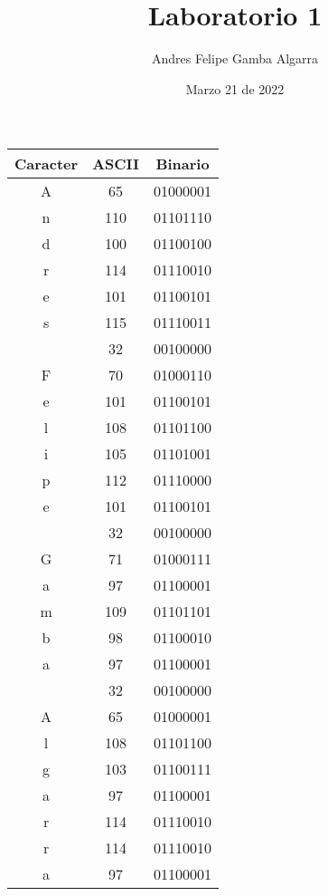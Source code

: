 \documentclass{article}
\title{Laboratorio 1}
\author{Andres Felipe Gamba Algarra}
\date{Marzo 21 de 2022}
\begin{document}
\maketitle

\section{}
\begin{center}
    \begin{tabular}{ |c|c|c| }
        \hline
        Caracter & ASCII & Binario\\
        \hline
        A & 65 & 01000001 \\
        n & 110 & 01101110 \\
        d & 100 & 01100100 \\
        r & 114 & 01110010 \\
        e & 101 & 01100101 \\
        s & 115 & 01110011 \\
          & 32 & 00100000 \\
        F & 70 & 01000110 \\
        e & 101 & 01100101 \\
        l & 108 & 01101100 \\
        i & 105 & 01101001 \\
        p & 112 & 01110000 \\
        e & 101 & 01100101 \\
          & 32 & 00100000 \\
        G & 71 & 01000111 \\
        a & 97 & 01100001 \\
        m & 109 & 01101101 \\
        b & 98 & 01100010 \\
        a & 97 & 01100001 \\
          & 32 & 00100000 \\
        A & 65 & 01000001 \\
        l & 108 & 01101100 \\
        g & 103 & 01100111 \\
        a & 97 & 01100001 \\
        r & 114 & 01110010 \\
        r & 114 & 01110010 \\
        a & 97 & 01100001  \\
        \hline
    \end{tabular}   
\end{center}
\end{document}
